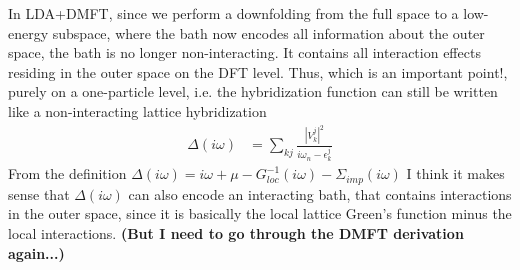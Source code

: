 \documentclass[12pt,a4paper]{scrartcl}
\numberwithin{equation}{section}
\begin{document}
In LDA+DMFT, since we perform a downfolding from the full space
to a low-energy subspace, where the bath now encodes all information 
about the outer space, the bath is no longer non-interacting.
It contains all interaction effects residing in the outer space
on the DFT level. Thus, which is an important point!, purely
on a one-particle level, i.e. the hybridization function can still 
be written like a non-interacting lattice hybridization
\begin{align}
\Delta(i\omega) &= \sum_{kj} \frac{|V^j_k|^2}{i\omega_n - \epsilon_k^j}
\end{align}
From the definition 
$\Delta(i\omega) = i\omega + \mu - G_{loc}^{-1}(i\omega) - \Sigma_{imp}(i\omega)$
I think it makes sense that $\Delta(i\omega)$ can also encode an interacting
bath, that contains interactions in the outer space,
since it is basically the local lattice Green's function minus the local interactions.
\textbf{(But I need to go through
the DMFT derivation again...)}

\bigskip
\end{document}
